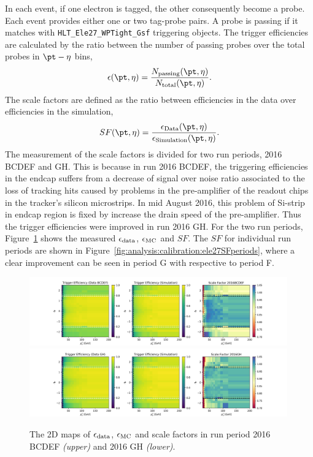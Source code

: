 In each event, if one electron is tagged, the other consequently become a probe. Each event provides either one or two tag-probe pairs. A probe is passing if it matches with \texttt{HLT\_Ele27\_WPTight\_Gsf} triggering objects. The trigger efficiencies are calculated by the ratio between the number of passing probes over the total probes in $\pt-\eta$ bins, 
\begin{equation*}
    \epsilon (\pt, \eta) = \frac{ N_{\rm passing} (\pt, \eta) } {  N_{\rm total} (\pt, \eta) }.
\end{equation*}
\noindent The scale factors are defined as the ratio between efficiencies in the data over efficiencies in the simulation,
\begin{equation}
SF (\pt, \eta) = \frac{\epsilon_{\rm{Data}} (\pt, \eta) }{\epsilon_{\rm{Simulation}} (\pt, \eta) }.
\end{equation}
\noindent The measurement of the scale factors is divided for two run periods, 2016 BCDEF and GH. This is because in run 2016 BCDEF,  the triggering efficiencies in the endcap suffers from a decrease of signal over noise ratio associated to the loss of tracking hits caused by problems in the pre-amplifier of the readout chips in the tracker's silicon microstrips. In mid August 2016, this problem of Si-strip in endcap region is fixed by increase the drain speed of the pre-amplifier. Thus the trigger efficiencies were improved in run 2016 GH. For the two run periods, Figure~\ref{fig:analysis:calibration:ele27SF} shows the measured $\epsilon_{\rm{data}}$, $\epsilon_{\rm{MC}}$ and $SF$. The $SF$ for individual run periods are shown in Figure~\ref{fig:analysis:calibration:ele27SFperiods}, where a clear improvement can be seen in period G with respective to period F.
\begin{figure}
    \centering
    \includegraphics[width=0.99\textwidth]{chapters/Analysis/sectionCalibration/figures/eTrigger/eff2d_BCDEF.png}
    \includegraphics[width=0.99\textwidth]{chapters/Analysis/sectionCalibration/figures/eTrigger/eff2d_GH.png}
    \caption{The 2D maps of $\epsilon_{\rm{data}}$, $\epsilon_{\rm{MC}}$ and scale factors in run period 2016 BCDEF \emph{(upper)} and 2016 GH \emph{(lower)}.}
    \label{fig:analysis:calibration:ele27SF}
\end{figure}
